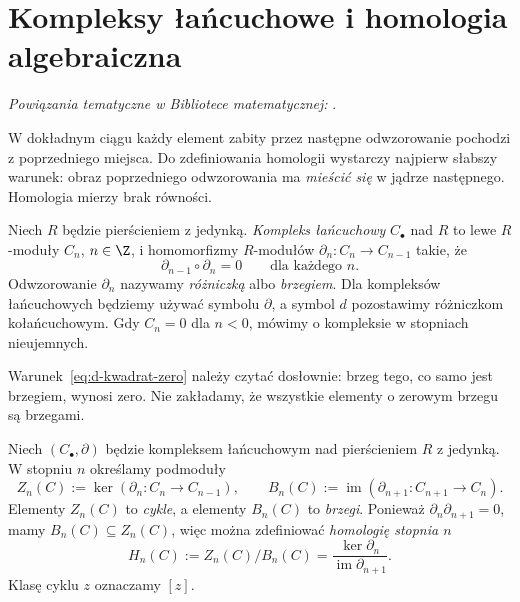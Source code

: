 \section{Kompleksy łańcuchowe i homologia algebraiczna}
\label{sec:kompleks-homologia}

\noindent\emph{Powiązania tematyczne w Bibliotece matematycznej:} .


W dokładnym ciągu każdy element zabity przez
następne odwzorowanie pochodzi z poprzedniego miejsca.
Do zdefiniowania homologii wystarczy najpierw
słabszy warunek: obraz poprzedniego odwzorowania ma
\emph{mieścić się} w jądrze następnego.
Homologia mierzy brak równości.

\begin{definicja}
\label{def:kompleks-lancuchowy}
Niech $R$ będzie pierścieniem z jedynką.
\emph{Kompleks łańcuchowy} $C_\bullet$ nad $R$
to lewe $R$-moduły $C_n$, $n\in\Z$, i homomorfizmy
$R$-modułów
$\partial_n:C_n\to C_{n-1}$ takie, że
\begin{equation}\label{eq:d-kwadrat-zero}
 \partial_{n-1}\circ \partial_n=0\qquad\text{dla każdego }n.
\end{equation}
Odwzorowanie $\partial_n$ nazywamy \emph{różniczką} albo
\emph{brzegiem}. Dla kompleksów łańcuchowych
będziemy używać symbolu $\partial$, a symbol $d$
pozostawimy różniczkom kołańcuchowym.
Gdy $C_n=0$ dla $n<0$,
mówimy o kompleksie w stopniach nieujemnych.
\end{definicja}

Warunek~\eqref{eq:d-kwadrat-zero} należy czytać
dosłownie: brzeg tego, co samo jest brzegiem,
wynosi zero. Nie zakładamy, że wszystkie
elementy o zerowym brzegu są brzegami.

\begin{definicja}
\label{def:homologia-algebraiczna}
Niech $(C_\bullet,\partial)$ będzie kompleksem
łańcuchowym nad pierścieniem $R$ z jedynką.
W stopniu $n$ określamy podmoduły
\[
 Z_n(C):=\ker(\partial_n:C_n\to C_{n-1}),\qquad
 B_n(C):=\operatorname{im}(\partial_{n+1}:C_{n+1}\to C_n).
\]
Elementy $Z_n(C)$ to \emph{cykle}, a elementy
$B_n(C)$ to \emph{brzegi}. Ponieważ
$\partial_n\partial_{n+1}=0$, mamy $B_n(C)\subseteq Z_n(C)$,
więc można zdefiniować \emph{homologię stopnia $n$}
\begin{equation}\label{eq:homologia-def}
 H_n(C):=Z_n(C)/B_n(C)
 =\frac{\ker \partial_n}{\operatorname{im}\partial_{n+1}}.
\end{equation}
Klasę cyklu $z$ oznaczamy $[z]$.
\end{definicja}

